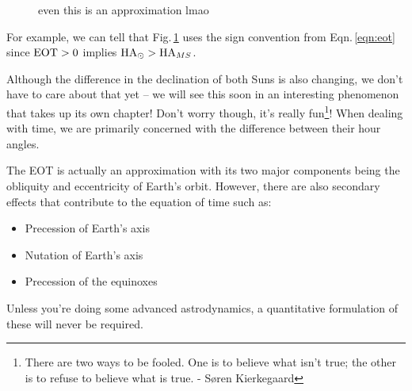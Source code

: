 \documentclass{article}
\begin{document}
\begin{figure}[h!]
    \centering
    \caption{even this is an approximation lmao}
    \label{fig:eot}
\end{figure}

For example, we can tell that Fig.\,\ref{fig:eot} uses the sign convention from Eqn.\,\ref{eqn:eot} since $\mathrm{EOT} > 0$ implies $\mathrm{HA}_\odot > \mathrm{HA}_{MS}$.

Although the difference in the declination of both Suns is also changing, we don't have to care about that yet -- we will see this soon in an interesting phenomenon that takes up its own chapter! Don't worry though, it's really fun\footnote{There are two ways to be fooled. One is to believe what isn't true; the other is to refuse to believe what is true. - Søren Kierkegaard}! When dealing with time, we are primarily concerned with the difference between their hour angles. 

The EOT is actually an approximation with its two major components being the obliquity and eccentricity of Earth's orbit. However, there are also secondary effects that contribute to the equation of time such as:
\begin{itemize}
    \item Precession of Earth's axis
    \item Nutation of Earth's axis
    \item Precession of the equinoxes
\end{itemize}
Unless you're doing some advanced astrodynamics, a quantitative formulation of these will never be required.
\end{document}
